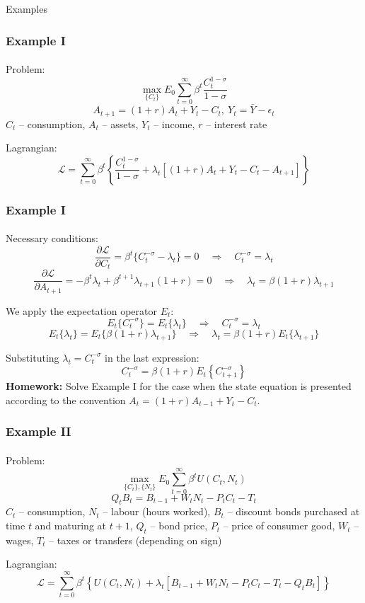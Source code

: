 \documentclass[10pt]{beamer}
\theoremstyle{definition}
\begin{document}
\begin{section}{Examples}\label{sec:ex}

\begin{frame}
\frametitle{Example I}
\framesubtitle{}
Problem:
\[ \max_{\{C_t\}} E_0 \sum_{t=0}^{\infty}\beta^t \frac{C_t^{1-\sigma}}{1-\sigma} \]
\[ A_{t+1}=(1+r)A_t + Y_t - C_t,~Y_t=\bar{Y}-\epsilon_t \]
$ C_t $ -- consumption, $ A_t $ -- assets, $ Y_t $ -- income, $ r $ -- interest rate \bigskip

Lagrangian:\[ \mathcal{L} = \sum_{t=0}^{\infty}\beta^t \left\{\frac{C_t^{1-\sigma}}{1-\sigma}+\lambda_t \left[(1+r)A_t + Y_t - C_t - A_{t+1}\right] \right\} \]
\end{frame}




\begin{frame}
\frametitle{Example I}
\framesubtitle{}
Necessary conditions:
\[ \frac{\partial \mathcal{L} }{\partial C_t} = \beta^t \{C_t^{-\sigma}-\lambda_t\} = 0 \quad\Longrightarrow\quad C_t^{-\sigma}=\lambda_t \]
\[ \frac{\partial \mathcal{L} }{\partial A_{t+1}} = -\beta^t \lambda_t + \beta^{t+1}\lambda_{t+1}(1+r) = 0 \quad\Longrightarrow\quad \lambda_t = \beta(1+r)\lambda_{t+1} \]

We apply the expectation operator $ E_t $:
\[ E_t \{C_t^{-\sigma}\}=E_t \{\lambda_t\} \quad\Longrightarrow\quad C_t^{-\sigma}=\lambda_t \]
\[ E_t \{\lambda_t\} = E_t\{\beta(1+r)\lambda_{t+1}\} \quad\Longrightarrow\quad \lambda_t = \beta(1+r)E_t\{\lambda_{t+1}\} \]

Substituting $ \lambda_t = C_t^{-\sigma} $ in the last expression:
\[ C_t^{-\sigma} = \beta (1+r)E_t \left\{C_{t+1}^{-\sigma}\right\} \] \pause
\textbf{Homework:} Solve Example I for the case when the state equation is presented according to the convention $A_{t}=(1+r)A_{t-1} + Y_t - C_t$.
\end{frame}


\begin{frame}
\frametitle{Example II}
\framesubtitle{}
Problem:
\[ \max_{\{C_t\},\{N_t\}} E_0 \sum_{t=0}^{\infty}\beta^t U(C_t,N_t) \]
\[ Q_t B_t = B_{t-1} + W_t N_t - P_t C_t - T_t  \]
$ C_t $ -- consumption, $ N_t $ -- labour (hours worked), $ B_t $ -- discount bonds purchased at time $ t $ and maturing at $ t+1 $, $ Q_t $ -- bond price, $ P_t $ -- price of consumer good, $ W_t $ -- wages, $ T_t $ -- taxes or transfers (depending on sign) \bigskip

Lagrangian:\[ \mathcal{L} = \sum_{t=0}^{\infty}\beta^t \left\{U(C_t,N_t)+\lambda_t \left[ B_{t-1} + W_t N_t - P_t C_t - T_t - Q_t B_t \right] \right\} \]
\end{frame}





\end{section}
\end{document}
